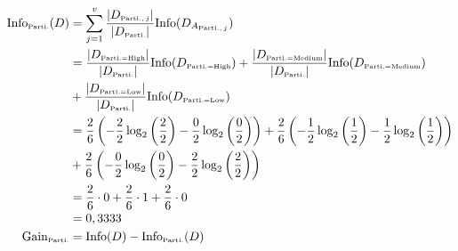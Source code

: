 \documentclass[
english,
smallborders
]{i6prcsht}
\newcommand{\OfSpecificValue}[3]{_{\text{\tiny #1#2#3}}}
\newcommand{\OfAttribute}[1]{_{\text{\tiny #1}}}
\begin{document}
\begin{solution}
\begin{enumerate}
\begin{enumerate}
\begin{enumerate}
		            \begin{alignat*}{3}
			            \text{Info}\OfAttribute{Parti.}(D) & = \sum_{j=1}^v \frac{|D\OfAttribute{Parti.$,j$}|}{|D\OfAttribute{Parti.}|} \text{Info}(D_{A\OfAttribute{Parti.$,j$}})                                                                                                                             \\
			                                               & = \frac{|D\OfSpecificValue{Parti.}{=}{High}|}{|D\OfAttribute{Parti.}|} \text{Info}(D\OfSpecificValue{Parti.}{=}{High}) + \frac{|D\OfSpecificValue{Parti.}{=}{Medium}|}{|D\OfAttribute{Parti.}|} \text{Info}(D\OfSpecificValue{Parti.}{=}{Medium}) \\
			                                               & + \frac{|D\OfSpecificValue{Parti.}{=}{Low}|}{|D\OfAttribute{Parti.}|} \text{Info}(D\OfSpecificValue{Parti.}{=}{Low})                                                                                                                              \\
			                                               & = \frac{2}{6} \left(-\frac{2}{2} \log_2\left(\frac{2}{2}\right) - \frac{0}{2} \log_2\left(\frac{0}{2}\right)\right) + \frac{2}{6} \left(-\frac{1}{2} \log_2\left(\frac{1}{2}\right) - \frac{1}{2} \log_2\left(\frac{1}{2}\right)\right)           \\
			                                               & + \frac{2}{6} \left(-\frac{0}{2} \log_2\left(\frac{0}{2}\right) - \frac{2}{2} \log_2\left(\frac{2}{2}\right)\right)                                                                                                                               \\
			                                               & = \frac{2}{6} \cdot 0 + \frac{2}{6} \cdot 1 + \frac{2}{6} \cdot 0                                                                                                                                                                                 \\
			                                               & =  0,3333                                                                                                                                                                                                                                         \\
			            \text{Gain}\OfAttribute{Parti.}    & = \text{Info}(D) - \text{Info}\OfAttribute{Parti.}(D)                                                                                                                                                                                             \\

\end{alignat*}
\end{enumerate}
\end{enumerate}
\end{enumerate}
\end{solution}
\end{document}
